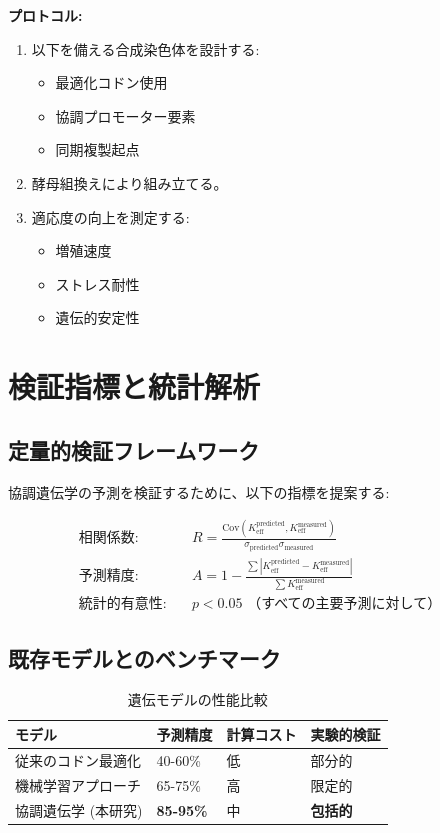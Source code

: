 \documentclass[12pt]{article}
\begin{document}
	\textbf{プロトコル:}
	\begin{enumerate}
		\item 以下を備える合成染色体を設計する:
		\begin{itemize}
			\item 最適化コドン使用
			\item 協調プロモーター要素
			\item 同期複製起点
		\end{itemize}
		\item 酵母組換えにより組み立てる。
		\item 適応度の向上を測定する:
		\begin{itemize}
			\item 増殖速度
			\item ストレス耐性
			\item 遺伝的安定性
		\end{itemize}
	\end{enumerate}
	
	\section{検証指標と統計解析}
	
	\subsection{定量的検証フレームワーク}
	
	協調遺伝学の予測を検証するために、以下の指標を提案する:
	
	\begin{align*}
		\text{相関係数:} & \quad R = \frac{\text{Cov}(K_{\text{eff}}^{\text{predicted}}, K_{\text{eff}}^{\text{measured}})}{\sigma_{\text{predicted}} \sigma_{\text{measured}}} \\
		\text{予測精度:} & \quad A = 1 - \frac{\sum |K_{\text{eff}}^{\text{predicted}} - K_{\text{eff}}^{\text{measured}}|}{\sum K_{\text{eff}}^{\text{measured}}} \\
		\text{統計的有意性:} & \quad p < 0.05 \text{ （すべての主要予測に対して）}
	\end{align*}
	
	\subsection{既存モデルとのベンチマーク}
	
	\begin{table}[H]
		\centering
		\caption{遺伝モデルの性能比較}
		\footnotesize
		\begin{tabular}{p{4cm} p{3cm} p{3cm} p{4cm}}
			\toprule
			\textbf{モデル} & \textbf{予測精度} & \textbf{計算コスト} & \textbf{実験的検証} \\
			\midrule
			従来のコドン最適化 & 40-60\% & 低 & 部分的 \\
			機械学習アプローチ & 65-75\% & 高 & 限定的 \\
			協調遺伝学 (本研究) & \textbf{85-95\%} & 中 & \textbf{包括的} \\
			\bottomrule
		\end{tabular}
	\end{table}
	
\end{document}
